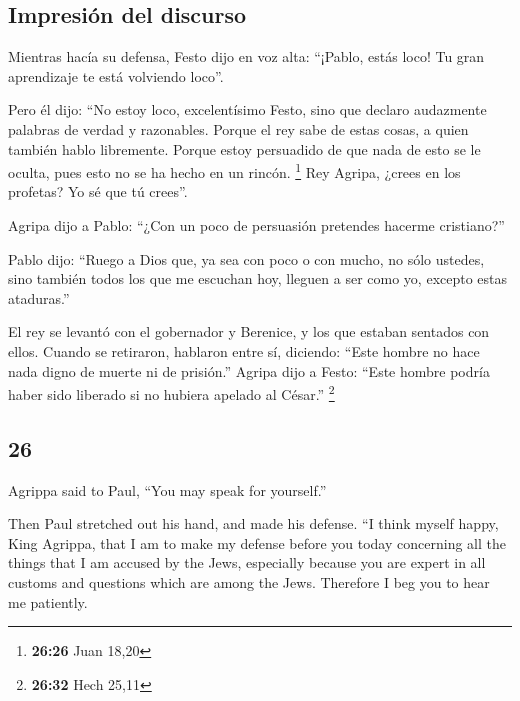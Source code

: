 \begin{paracol}{2}
\hypertarget{impresiuxf3n-del-discurso}{%
\subsection{Impresión del discurso}\label{impresiuxf3n-del-discurso}}

 Mientras hacía su defensa, Festo dijo en voz alta:
``¡Pablo, estás loco! Tu gran aprendizaje te está volviendo loco''.

 Pero él dijo: ``No estoy loco, excelentísimo Festo, sino
que declaro audazmente palabras de verdad y razonables. 
Porque el rey sabe de estas cosas, a quien también hablo libremente.
Porque estoy persuadido de que nada de esto se le oculta, pues esto no
se ha hecho en un rincón. \footnote{\textbf{26:26} Juan 18,20}
 Rey Agripa, ¿crees en los profetas? Yo sé que tú
crees''.

 Agripa dijo a Pablo: ``¿Con un poco de persuasión
pretendes hacerme cristiano?''

 Pablo dijo: ``Ruego a Dios que, ya sea con poco o con
mucho, no sólo ustedes, sino también todos los que me escuchan hoy,
lleguen a ser como yo, excepto estas ataduras.''

 El rey se levantó con el gobernador y Berenice, y los
que estaban sentados con ellos.  Cuando se retiraron,
hablaron entre sí, diciendo: ``Este hombre no hace nada digno de muerte
ni de prisión.''  Agripa dijo a Festo: ``Este hombre
podría haber sido liberado si no hubiera apelado al César.'' \footnote{\textbf{26:32}
  Hech 25,11}

\switchcolumn
\begin{otherlanguage}{english}

\hypertarget{section-51}{%
\section{26}\label{section-51}}

 Agrippa said to Paul, ``You may speak for yourself.''

Then Paul stretched out his hand, and made his defense. 
``I think myself happy, King Agrippa, that I am to make my defense
before you today concerning all the things that I am accused by the
Jews,  especially because you are expert in all customs
and questions which are among the Jews. Therefore I beg you to hear me
patiently.


\end{otherlanguage}
\end{paracol}
